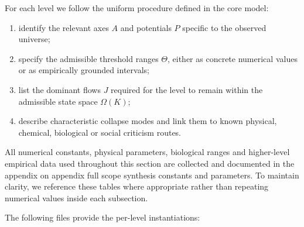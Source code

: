 For each level we follow the uniform procedure defined in the core model:
\begin{enumerate}
    \item identify the relevant axes \(A\) and potentials \(P\) specific 
          to the observed universe;
    \item specify the admissible threshold ranges \(\Theta\), either as 
          concrete numerical values or as empirically grounded intervals;
    \item list the dominant flows \(J\) required for the level to remain 
          within the admissible state space \(\Omega(K)\);
    \item describe characteristic collapse modes and link them to known 
          physical, chemical, biological or social criticism routes.
\end{enumerate}

All numerical constants, physical parameters, biological ranges and 
higher-level empirical data used throughout this section are collected 
and documented in the appendix on appendix full scope synthesis constants and parameters. 
To maintain clarity, we reference these tables where appropriate rather 
than repeating numerical values inside each subsection.

The following files provide the per-level instantiations:














